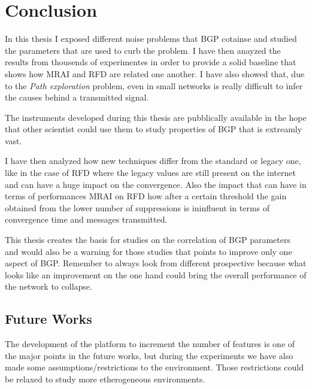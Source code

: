 \chapter{Conclusion}
\label{cha:conclusion}

In this thesis I exposed different noise problems that \ac{BGP} cotainse and
studied the parameters that are used to curb the problem.
I have then anayzed the results from thousends of experimentes in order to 
provide a solid baseline that shows how \ac{MRAI} and \ac{RFD} are related
one another.
I have also showed that, due to the \textit{Path exploration} problem, even 
in small networks is really difficult to infer the causes behind a transmitted
signal.

The instruments developed during this thesis are pubblically available in the
hope that other scientist could use them to study properties of \ac{BGP} that
is extreamly vast.

I have then analyzed how new techniques differ from the standard or legacy one,
like in the case of \ac{RFD} where the legacy values are still present on the
internet and can have a huge impact on the convergence.
Also the impact that can have in terms of performances \ac{MRAI} on \ac{RFD}
how after a certain threshold the gain obtained from the lower number of 
suppressions is ininfluent in terms of convergence time and messages transmitted.

This thesis creates the basis for studies on the correlation of \ac{BGP} parameters
and would also be a warning for those studies that points to improve only 
one aspect of \ac{BGP}.
Remember to always look from different prospective because what looks like an
improvement on the one hand could bring the overall performance of the 
network to collapse.


\section{Future Works}
\label{sec:future_works}

The development of the platform to increment the number of features is one of 
the major points in the future works, but during the experiments we have also
made some assumptions/restrictions to the environment.
Those restrictions could be relaxed to study more etherogeneous environments.

